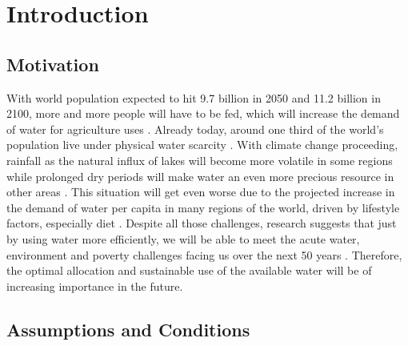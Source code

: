 \documentclass[12pt, a4paper, oneside]{article}
\begin{document}
	
	\tableofcontents
	\clearpage
	
	
	\section{Introduction}
	
	\subsection{Motivation}
With world population expected to hit 9.7 billion in 2050 and 11.2 billion in 2100, more and more people will have to be fed, which will increase the demand of water for agriculture uses \citep{un2019}.
Already today, around one third of the world's population live under physical water scarcity \citep{vorosmarty2000global, alcamo2003global, oki2006global}.
With climate change proceeding, rainfall as the natural influx of lakes will become more volatile in some regions while prolonged dry periods will make water an even more precious resource in other areas \citep{guhathakurta2011impact}.
This situation will get even worse due to the projected increase in the demand of water per capita in many regions of the world, driven by lifestyle factors, especially diet \citep{vorosmarty2000global}.
Despite all those challenges, research suggests that just by using water more efficiently, we will be able to meet the acute water, environment and poverty challenges facing us over the next 50 years \citep{molden2013water}.
Therefore, the optimal allocation and sustainable use of the available water will be of increasing importance in the future.


\subsection{Assumptions and Conditions}
\end{document}
